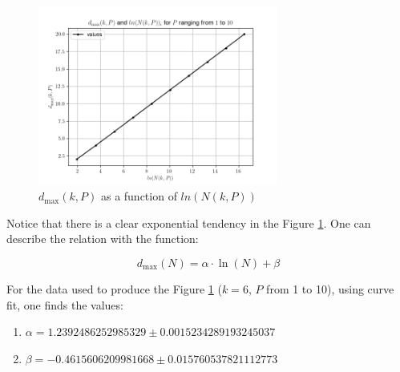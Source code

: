 \documentclass{article}
\begin{document}
\begin{figure}[!ht]
    \centering
    \includegraphics[width=0.7\textwidth]{../result/diameter_as_a_function_of_the_number_of_nodes.png}
    \caption{$d_{\max}(k, P)$ as a function of $ln{\left(N(k,P)\right)}$}
    \label{figure:plot}
\end{figure}

Notice that there is a clear exponential tendency in the Figure \ref{figure:plot}. One can describe the relation with the function:

\begin{equation}
    d_{\max}(N) = \alpha \cdot \ln(N) + \beta
\end{equation}

For the data used to produce the Figure \ref{figure:plot} ($k=6$, $P$ from 1 to 10), using curve fit, one finds the values:

\begin{enumerate}
    \item $\alpha = 1.2392486252985329 \pm 0.0015234289193245037$
    \item $\beta = -0.4615606209981668 \pm 0.015760537821112773$
\end{enumerate}
\end{document}
